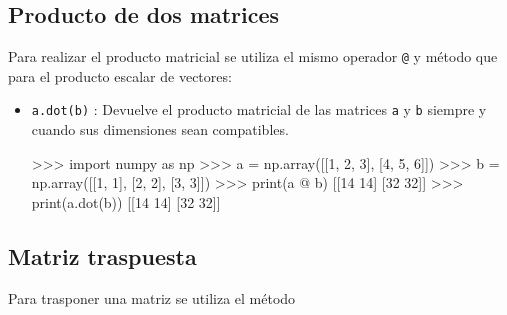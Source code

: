 \documentclass[
  spanish,
  a4paper,
]{scrreport}
\newenvironment{Shaded}{\begin{snugshade}}{\end{snugshade}}
\newcommand{\BuiltInTok}[1]{\textcolor[rgb]{0.00,0.23,0.31}{#1}}
\newcommand{\DecValTok}[1]{\textcolor[rgb]{0.68,0.00,0.00}{#1}}
\newcommand{\ImportTok}[1]{\textcolor[rgb]{0.00,0.46,0.62}{#1}}
\newcommand{\NormalTok}[1]{\textcolor[rgb]{0.00,0.23,0.31}{#1}}
\newcommand{\OperatorTok}[1]{\textcolor[rgb]{0.37,0.37,0.37}{#1}}
\begin{document}
\subsection{Producto de dos matrices}\label{producto-de-dos-matrices}

Para realizar el producto matricial se utiliza el mismo operador
\texttt{@} y método que para el producto escalar de vectores:

\begin{itemize}
\item
  \texttt{a.dot(b)} : Devuelve el producto matricial de las matrices
  \texttt{a} y \texttt{b} siempre y cuando sus dimensiones sean
  compatibles.

\begin{Shaded}
\begin{Highlighting}[]
\OperatorTok{\textgreater{}\textgreater{}\textgreater{}} \ImportTok{import}\NormalTok{ numpy }\ImportTok{as}\NormalTok{ np}
\OperatorTok{\textgreater{}\textgreater{}\textgreater{}}\NormalTok{ a }\OperatorTok{=}\NormalTok{ np.array([[}\DecValTok{1}\NormalTok{, }\DecValTok{2}\NormalTok{, }\DecValTok{3}\NormalTok{], [}\DecValTok{4}\NormalTok{, }\DecValTok{5}\NormalTok{, }\DecValTok{6}\NormalTok{]])}
\OperatorTok{\textgreater{}\textgreater{}\textgreater{}}\NormalTok{ b }\OperatorTok{=}\NormalTok{ np.array([[}\DecValTok{1}\NormalTok{, }\DecValTok{1}\NormalTok{], [}\DecValTok{2}\NormalTok{, }\DecValTok{2}\NormalTok{], [}\DecValTok{3}\NormalTok{, }\DecValTok{3}\NormalTok{]])}
\OperatorTok{\textgreater{}\textgreater{}\textgreater{}} \BuiltInTok{print}\NormalTok{(a }\OperatorTok{@}\NormalTok{ b)}
\NormalTok{[[}\DecValTok{14} \DecValTok{14}\NormalTok{]}
\NormalTok{[}\DecValTok{32} \DecValTok{32}\NormalTok{]]}
\OperatorTok{\textgreater{}\textgreater{}\textgreater{}} \BuiltInTok{print}\NormalTok{(a.dot(b))}
\NormalTok{[[}\DecValTok{14} \DecValTok{14}\NormalTok{]}
\NormalTok{[}\DecValTok{32} \DecValTok{32}\NormalTok{]]}
\end{Highlighting}
\end{Shaded}
\end{itemize}

\subsection{Matriz traspuesta}\label{matriz-traspuesta}

Para trasponer una matriz se utiliza el método
\end{document}
